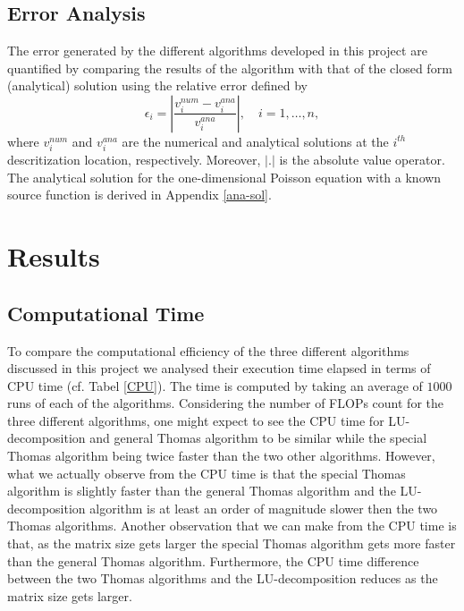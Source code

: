 \documentclass[a4paper]{article}
\begin{document}
\subsection{Error Analysis}
The error generated by the different algorithms developed in this project are quantified by comparing the results of the algorithm with that of the closed form (analytical) solution using the relative error defined by
\begin{equation}
  \epsilon_i = \left|\frac{v_i^{num} - v_i^{ana}}{v_i^{ana}}\right|, \quad i=1,\dots,n,
  \label{rerr}
\end{equation}
where $v_i^{num}$ and $v_i^{ana}$ are the numerical and analytical solutions at the $i^{th}$ descritization location, respectively. Moreover, $\left|.\right|$ is the absolute value operator. The analytical solution for the one-dimensional Poisson equation with a known source function is derived in Appendix \ref{ana-sol}.
  
\section{Results}

\subsection{Computational Time}
To compare the computational efficiency of the three different algorithms discussed in this project we analysed their execution time elapsed in terms of CPU time (cf. Tabel \ref{CPU}). The time is computed by taking an average of $1000$ runs of each of the algorithms. Considering the number of FLOPs count for the three different algorithms, one might expect to see the CPU time for LU-decomposition and general Thomas algorithm to be similar while the special Thomas algorithm being twice faster than the two other algorithms. However, what we actually observe from the CPU time is that the special Thomas algorithm is slightly faster than the general Thomas algorithm and the LU-decomposition algorithm is at least an order of magnitude slower then the two Thomas algorithms. Another observation that we can make from the CPU time is that, as the matrix size gets larger the special Thomas algorithm gets more faster than the general Thomas algorithm. Furthermore, the CPU time difference between the two Thomas algorithms and the LU-decomposition reduces as the matrix size gets larger.
\end{document}
